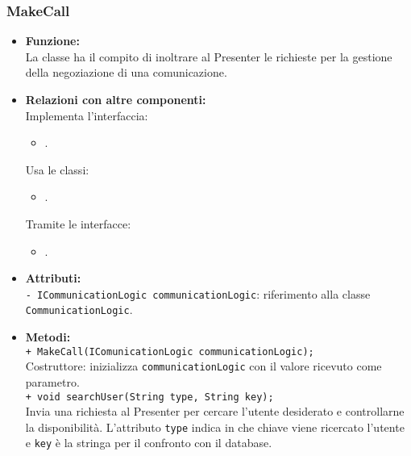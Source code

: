 {\begin{sloppypar}
{		%
		\subsubsection{MakeCall}\label{ssub:MakeCall}{
			\begin{itemize}
				\item[]  \textbf{Funzione:} \\
					La classe ha il compito di inoltrare al Presenter le richieste per la gestione della negoziazione 
					di una comunicazione.\\
					
					\item[]  \textbf{Relazioni con altre componenti:} \\
						Implementa l'interfaccia:
						\begin{itemize}
							\item[] .
						\end{itemize}
						Usa le classi:
						\begin{itemize}
							\item[] .
						\end{itemize}
						Tramite le interfacce:
						\begin{itemize}
							\item[] .
						\end{itemize}
							
					\item[]  \textbf{Attributi:}\\
						\texttt{- ICommunicationLogic communicationLogic}: riferimento alla classe \texttt{CommunicationLogic}.\\
						
					\item[] \textbf{Metodi:}\\
						\texttt{+ MakeCall(IComunicationLogic communicationLogic);}\\
						Costruttore: inizializza \texttt{communicationLogic} con il valore ricevuto come parametro.\\

						\texttt{+ void searchUser(String type, String key);}\\
						Invia una richiesta al Presenter per cercare l'utente desiderato e controllarne la disponibilità. 
						L'attributo \texttt{type} indica in che chiave viene ricercato l'utente e \texttt{key} è la stringa per il confronto con il database\g.\\
			\end{itemize}
			}

}
\end{sloppypar}}

